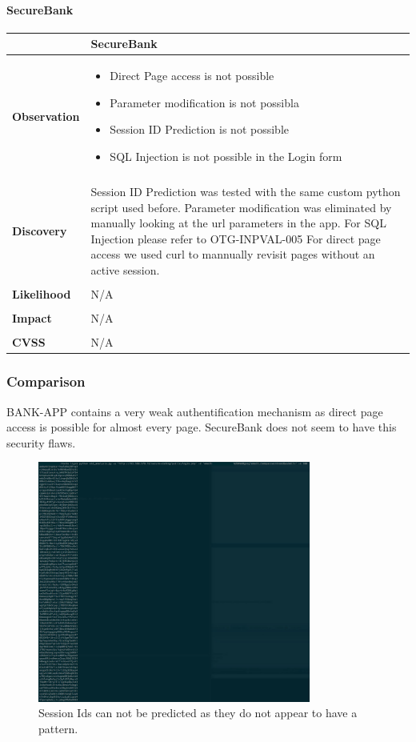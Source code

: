 \paragraph{SecureBank} \mbox{}
\begin{longtable*}{p{.20\textwidth} | p{.80\textwidth}}
    \hline
    & \textbf{SecureBank} \\ 
    \hline
    \textbf{Observation} &
        \begin{itemize}
		  \item Direct Page access is not possible
		  \item Parameter modification is not possibla
		  \item Session ID Prediction is not possible
		  \item SQL Injection is not possible in the Login form
		\end{itemize}
    \\\\
    \textbf{Discovery} &
    	Session ID Prediction was tested with the same custom python script used before. \newline
        Parameter modification was eliminated by manually looking at the url parameters in the app. \newline
        For SQL Injection please refer to OTG-INPVAL-005 \newline
        For direct page access we used curl to mannually revisit pages without an active session. \newline
    \\\\
    \textbf{Likelihood} &
       N/A
    \\\\
    \textbf{Impact} &
        N/A
    \\\\
    \textbf{CVSS} &
        N/A
    \\
    \hline
\end{longtable*}
\subsubsection{Comparison}
BANK-APP contains a very weak authentification mechanism as direct page access is possible for almost every page.
SecureBank does not seem to have this security flaws.

\begin{figure}[p]
    \centering
    \includegraphics[width=0.8\textwidth]{figures/OTG-AUTHN-004-1.jpg}
    \caption{Session Ids can not be predicted as they do not appear to have a pattern.}
    \label{fig:OTG_AUTHN_004_1}
\end{figure}
\clearpage